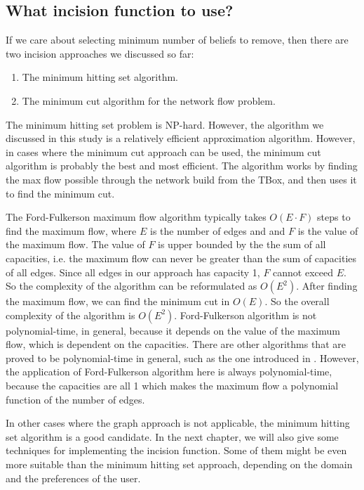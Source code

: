 \subsection{What incision function to use?}
If we care about selecting minimum number of beliefs to remove, then there are two incision approaches we discussed so far:
\begin{enumerate}
\item The minimum hitting set algorithm.
\item The minimum cut algorithm for the network flow problem.
\end{enumerate}
The minimum hitting set problem is NP-hard. However, the algorithm we discussed in this study is a relatively efficient approximation algorithm. However, in cases where the minimum cut approach can be used, the minimum cut algorithm is probably the best and most efficient. The algorithm works by finding the max flow possible through the network build from the TBox, and then uses it to find the minimum cut.

The Ford-Fulkerson maximum flow algorithm typically takes $O(E \cdot F)$ steps to find the maximum flow, where $E$ is the number of edges and and $F$ is the value of the maximum flow. The value of $F$ is upper bounded by the the sum of all capacities, i.e. the maximum flow can never be greater than the sum of capacities of all edges. Since all edges in our approach has capacity 1, $F$ cannot exceed $E$. So the complexity of the algorithm can be reformulated as $O(E^2)$. After finding the maximum flow, we can find the minimum cut in $O(E)$. So the overall complexity of the algorithm is $O(E^2)$. Ford-Fulkerson algorithm is not polynomial-time, in general, because it depends on the value of the maximum flow, which is dependent on the capacities. There are other algorithms that are proved to be polynomial-time in general, such as the one introduced in \cite{preflow}. However, the application of Ford-Fulkerson algorithm here is always polynomial-time, because the capacities are all 1 which makes the maximum flow a polynomial function of the number of edges.

In other cases where the graph approach is not applicable, the minimum hitting set algorithm is a good candidate. In the next chapter, we will also give some techniques for implementing the incision function. Some of them might be even more suitable than the minimum hitting set approach, depending on the domain and the preferences of the user.